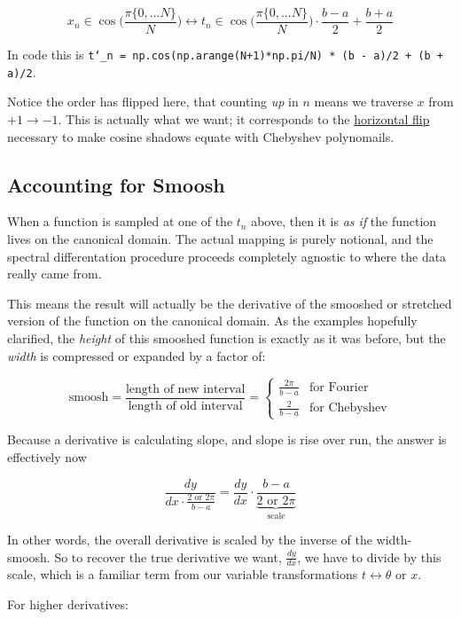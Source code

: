 \documentclass[10pt]{article}
\begin{document}
$$x_n \in \cos\!\Big(\frac{\pi \{0, ... N\}}{N}\Big) \leftrightarrow t_n \in \cos\!\Big(\frac{\pi \{0, ... N\}}{N}\Big) \cdot \frac{b - a}{2} + \frac{b + a}{2}$$

In code this is \texttt{t\char`_n = np.cos(np.arange(N+1)*np.pi/N) * (b - a)/2 + (b + a)/2}.\newline

Notice the order has flipped here, that counting \textit{up} in $n$ means we traverse $x$ from $+1 \rightarrow -1$. This is actually what we want; it corresponds to the \hyperref[cylinder]{horizontal flip} necessary to make cosine shadows equate with Chebyshev polynomails.

\subsection{Accounting for Smoosh}

When a function is sampled at one of the $t_n$ above, then it is \textit{as if} the function lives on the canonical domain. The actual mapping is purely notional, and the spectral differentation procedure proceeds completely agnostic to where the data really came from.

This means the result will actually be the derivative of the smooshed or stretched version of the function on the canonical domain. As the examples hopefully clarified, the \textit{height} of this smooshed function is exactly as it was before, but the \textit{width} is compressed or expanded by a factor of:

$$\text{smoosh} = \frac{\text{length of new interval}}{\text{length of old interval}} = \begin{cases} \frac{2\pi}{b-a} & \text{for Fourier} \\ \frac{2}{b-a} & \text{for Chebyshev} \end{cases}$$

Because a derivative is calculating slope, and slope is rise over run, the answer is effectively now

$$\frac{dy}{dx \cdot \frac{2 \text{ or } 2\pi}{b-a}} = \frac{dy}{dx} \cdot \underbrace{\frac{b-a}{2 \text{ or } 2\pi}}_{\text{scale}}$$

In other words, the overall derivative is scaled by the inverse of the width-smoosh. So to recover the true derivative we want, $\frac{dy}{dx}$, we have to divide by this scale, which is a familiar term from our variable transformations $t \leftrightarrow \theta \text{ or } x$.

For higher derivatives:
\end{document}
